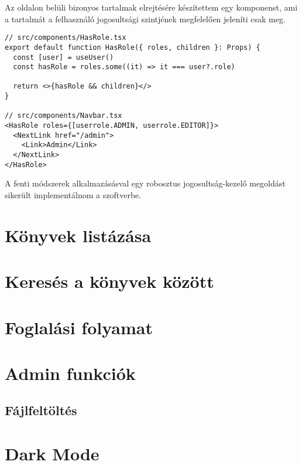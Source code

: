 Az oldalon belüli bizonyos tartalmak elrejtésére készítettem egy komponenst, ami a tartalmát a felhasználó jogosultsági szintjének
megfelelően jeleníti csak meg.

\begin{lstlisting}[caption=Authorizáció komponens és használata]
// src/components/HasRole.tsx
export default function HasRole({ roles, children }: Props) {
  const [user] = useUser()
  const hasRole = roles.some((it) => it === user?.role)

  return <>{hasRole && children}</>
}

// src/components/Navbar.tsx
<HasRole roles={[userrole.ADMIN, userrole.EDITOR]}>
  <NextLink href="/admin">
    <Link>Admin</Link>
  </NextLink>
</HasRole>
\end{lstlisting}

A fenti módszerek alkalmazásásval egy robosztus jogosultság-kezelő megoldást sikerült implementálnom a szoftverbe.


\section{Könyvek listázása}

\section{Keresés a könyvek között}

\section{Foglalási folyamat}

\section{Admin funkciók}

\subsection{Fájlfeltöltés}

\section{Dark Mode}


